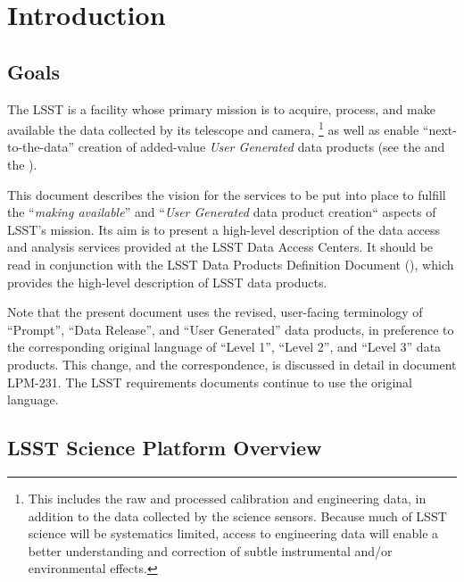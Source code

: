 \section{Introduction\label{sec:intro}}

\subsection{Goals}

The LSST is a facility whose primary mission is to acquire, process, and
make available the data collected by its telescope and camera,
\footnote{This includes the raw and processed calibration and engineering data, in addition to the data collected by the science sensors.
Because much of LSST science will be systematics limited, access to engineering data will enable a better understanding and correction of subtle instrumental and/or environmental effects.}
as well as enable ``next-to-the-data'' creation of added-value \textit{User Generated} data products (see the \SRD and the \LSR).

This document describes the vision for the services to be put into place to
fulfill the ``\emph{making available}'' and ``\emph{User Generated} data product creation``
aspects of LSST's mission. Its aim is to present a high-level
description of the data access and analysis services provided at the
LSST Data Access Centers. It should be read in conjunction with the
LSST Data Products Definition Document (\DPDD), which provides the high-level
description of LSST data products.

Note that the present document uses the revised, user-facing terminology of ``Prompt'', ``Data Release'', and ``User Generated'' data products, in preference to the corresponding original language of ``Level 1'', ``Level 2'', and ``Level 3'' data products.
This change, and the correspondence, is discussed in detail in document LPM-231.
The LSST requirements documents continue to use the original language.

\subsection{LSST Science Platform Overview}

